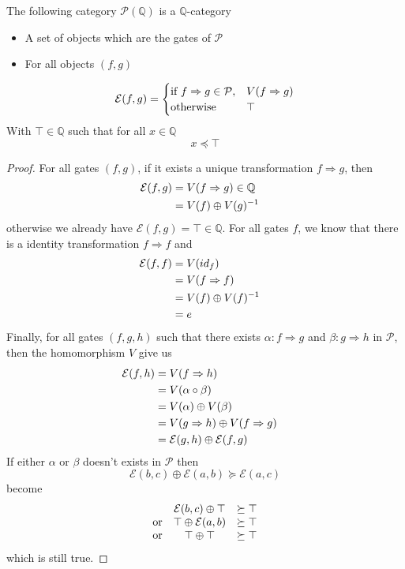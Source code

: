 \documentclass[a4paper]{article}
\begin{document}
\begin{proposition}
The following category $\mathcal{P}(\mathbb{Q})$ is a $\mathbb{Q}$-category
\begin{itemize}
\item A set of objects which are the gates of $\mathcal{P}$
\item For all objects $(f, g)$
\end{itemize}
\[
\mathcal{E}(f, g) =
\begin{cases}
\textrm{if } f \Rightarrow g \in \mathcal{P}, &V(f \Rightarrow g) \cr
\textrm{otherwise } &\top
\end{cases}
\]
With $\top \in \mathbb{Q}$ such that for all $x \in \mathbb{Q}$
\[
x \preceq \top
\]

\begin{proof}
For all gates $(f, g)$, if it exists a unique transformation $f \Rightarrow
  g$, then
\begin{align}
\mathcal{E}(f, g) &= V(f \Rightarrow g) \in \mathbb{Q} \cr
&= V(f) \oplus V(g)^{-1}
\end{align}
otherwise we already have $\mathcal{E}(f, g) = \top \in \mathbb{Q}$.
For all gates $f$, we know that there is a identity transformation $f
  \Rightarrow f$ and
\begin{align}
\mathcal{E}(f, f) &= V(id_f) \cr
&= V(f \Rightarrow f)\cr
&= V(f) \oplus V(f)^{-1} \cr
&= e
\end{align}
Finally, for all gates $(f, g, h)$ such that there exists $\alpha: f \Rightarrow
  g$ and $\beta: g \Rightarrow h$ in $\mathcal{P}$, then the homomorphism $V$
    give us
\begin{align}
\mathcal{E}(f, h) &= V(f \Rightarrow h) \cr
&= V(\alpha \circ \beta) \cr
&= V(\alpha) \oplus V(\beta) \cr
&= V(g \Rightarrow h) \oplus V(f \Rightarrow g) \cr
&= \mathcal{E}(g, h) \oplus \mathcal{E}(f, g)
\end{align}
If either $\alpha$ or $\beta$ doesn't exists in $\mathcal{P}$ then
\[
\mathcal{E}(b, c) \oplus \mathcal{E}(a, b) \succeq \mathcal{E}(a, c)
\]
become
\[\begin{matrix}
&\mathcal{E}(b, c) \oplus \top &\succeq \top \cr
\textrm{or} &\top \oplus \mathcal{E}(a, b) &\succeq \top \cr
\textrm{or} &\top \oplus \top &\succeq \top
\end{matrix}\]
which is still true.
\end{proof}
\end{proposition}
\end{document}
